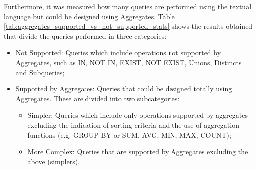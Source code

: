 
\begin{table}[ht]
	\caption{Queries that contain operations not supported by Aggregates}
	\label{tab:aggregates_operations_not_supported_stats}
\centering
{}
\end{table}

Furthermore, it was measured how many queries are performed using the textual language but could be designed using Aggregates. Table \ref{tab:aggregates_supported_vs_not_supported_stats} shows the results obtained that divide the queries performed in three categories:

\begin{itemize}
    \item Not Supported: Queries which include operations not supported by Aggregates, such as IN, NOT IN, EXIST, NOT EXIST, Unions, Distincts and Subqueries;
    \item Supported by Aggregates: Queries that could be designed totally using Aggregates. These are divided into two subcategories:
    \begin{itemize}
        \item Simpler: Queries which include only operations supported by aggregates excluding the indication of sorting criteria and the use of aggregation functions (e.g. GROUP BY or SUM, AVG, MIN, MAX, COUNT);
        \item More Complex: Queries that are supported by Aggregates excluding the above (simplers).
    \end{itemize}
\end{itemize}

